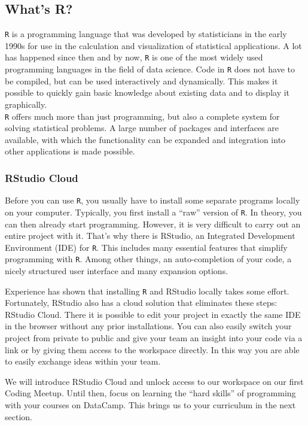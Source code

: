 \documentclass[
  11pt,
]{article}
\begin{document}
\hypertarget{whats-r}{%
\subsection{What's R?}\label{whats-r}}

\texttt{R} is a programming language that was developed by statisticians in the early 1990s for use in the calculation and visualization of statistical applications. A lot has happened since then and by now, \texttt{R} is one of the most widely used programming languages in the field of data science. Code in \texttt{R} does not have to be compiled, but can be used interactively and dynamically. This makes it possible to quickly gain basic knowledge about existing data and to display it graphically.\\
\texttt{R} offers much more than just programming, but also a complete system for solving statistical problems. A large number of packages and interfaces are available, with which the functionality can be expanded and integration into other applications is made possible.

\hypertarget{rstudio-cloud}{%
\subsubsection{RStudio Cloud}\label{rstudio-cloud}}

Before you can use \texttt{R}, you usually have to install some separate programs locally on your computer. Typically, you first install a ``raw'' version of \texttt{R}. In theory, you can then already start programming. However, it is very difficult to carry out an entire project with it. That's why there is RStudio, an Integrated Development Environment (IDE) for \texttt{R}. This includes many essential features that simplify programming with \texttt{R}. Among other things, an auto-completion of your code, a nicely structured user interface and many expansion options.

Experience has shown that installing \texttt{R} and RStudio locally takes some effort. Fortunately, RStudio also has a cloud solution that eliminates these steps: RStudio Cloud. There it is possible to edit your project in exactly the same IDE in the browser without any prior installations. You can also easily switch your project from private to public and give your team an insight into your code via a link or by giving them access to the workspace directly. In this way you are able to easily exchange ideas within your team.

We will introduce RStudio Cloud and unlock access to our workspace on our first Coding Meetup. Until then, focus on learning the ``hard skills'' of programming with your courses on DataCamp. This brings us to your curriculum in the next section.
\end{document}
